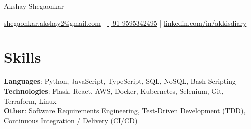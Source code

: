 \documentclass[11pt]{article}       %
\begin{document}
\centerline{\Huge Akshay Shegaonkar}

\vspace{5pt}

\centerline{\href{mailto:shegaonkar.akshay2@gmail.com}{shegaonkar.akshay2@gmail.com} | \href{tel:+919595342495}{+91-9595342495} | \href{https://www.linkedin.com/in/akkisdiary}{linkedin.com/in/akkisdiary}}

\vspace{-10pt}

\section*{Skills}
\textbf{Languages}: Python, JavaScript, TypeScript, SQL, NoSQL, Bash Scripting  \\
\textbf{Technologies}: Flask, React, AWS, Docker, Kubernetes, Selenium, Git, Terraform, Linux \\
\textbf{Other}: Software Requirements Engineering, Test-Driven Development (TDD), Continuous Integration / Delivery (CI/CD)
\vspace{-6.5pt}

\end{document}
